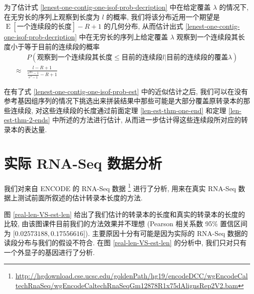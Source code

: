 为了估计式 \eqref{lenest-one-contig-one-isof-prob-decription} 
中在给定覆盖 $\lambda$ 的情况下, 在无穷长的序列上观察到长度为 $l$ 的概率, 
我们将该分布近用一个期望是 $\operatorname{E}[\text{一个连续段的长度}] -R+1$ 的几何分布, 
从而估计出式 \ref{lenest-one-contig-one-isof-prob-decription} 
中在无穷长的序列上给定覆盖 $\lambda$ 观察到一个连续段其长度小于等于目前的连续段的概率
\begin{align}
\label{lenest-one-contig-one-isof-prob-est}
& P(\text{观察到一个连续段其长度} \leq \text{目前的连续段} l |\text{目前的连续段的覆盖} \lambda) \nonumber \\
\approx & \frac{l-R+1}{\frac{e^{R\lambda} -1}{e^{\lambda}-1} -R+1}
\end{align}

在有了式 \eqref{lenest-one-contig-one-isof-prob-est} 中的近似估计之后, 
我们可以在没有参考基因组序列的情况下挑选出来拼装结果中那些可能是大部分覆盖原转录本的那些连续段, 
对这些连续段的长度通过前面定理 \ref{len-est-thm-one-end} 和定理 
\ref{len-est-thm-2-ends} 中所述的方法进行估计, 
从而进一步估计得这些连续段所对应的转录本的表达量. 


\section{实际 RNA-Seq 数据分析}
我们对来自 ENCODE \cite{encode} 的 RNA-Seq 数据 
\footnote{\url{http://hgdownload.cse.ucsc.edu/goldenPath/hg19/encodeDCC/wgEncodeCaltechRnaSeq/wgEncodeCaltechRnaSeqGm12878R1x75dAlignsRep2V2.bam}} 
进行了分析, 
用来在真实 RNA-Seq 数据上测试前面所叙述的估计转录本长度的方法. 

图 \ref{real-len-VS-est-len} 给出了我们估计的转录本的长度和真实的转录本的长度的比较, 
由该图课件目前我们的方法效果并不理想 
(Pearson 相关系数 95\% 置信区间为 $[0.02573188, 0.17556616$]). 
主要原因十分有可能是因为实际的 RNA-Seq 数据的读段分布与我们的假设不符合. 
在图 \ref{real-len-VS-est-len} 的分析中, 我们只对只有一个外显子的基因进行了分析. 

